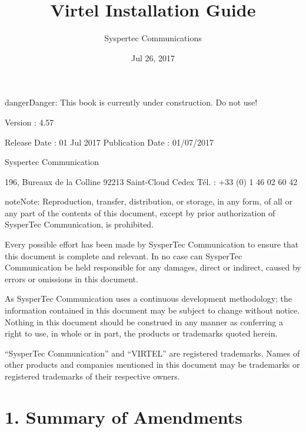 \documentclass[letterpaper,10pt,english]{sphinxmanual}
\title{Virtel Installation Guide}
\date{Jul 26, 2017}
\author{Syspertec Communications}
\begin{document}
\maketitle
\sphinxtableofcontents
{}\label{\detokenize{Installation_Guide::doc}}




\begin{sphinxadmonition}{danger}{Danger:}
This book is currently under construction. Do not use!
\end{sphinxadmonition}

Version : 4.57

Release Date : 01 Jul 2017 Publication Date : 01/07/2017

Syspertec Communication

196, Bureaux de la Colline 92213 Saint-Cloud Cedex Tél. : +33 (0) 1 46 02 60 42


\begin{sphinxadmonition}{note}{Note:}
Reproduction, transfer, distribution, or storage, in any form, of all or any part of
the contents of this document, except by prior authorization of SysperTec
Communication, is prohibited.

Every possible effort has been made by SysperTec Communication to ensure that this document
is complete and relevant. In no case can SysperTec Communication be held responsible for
any damages, direct or indirect, caused by errors or omissions in this document.

As SysperTec Communication uses a continuous development methodology; the information
contained in this document may be subject to change without notice. Nothing in this
document should be construed in any manner as conferring a right to use, in whole or in
part, the products or trademarks quoted herein.

“SysperTec Communication” and “VIRTEL” are registered trademarks. Names of other products
and companies mentioned in this document may be trademarks or registered trademarks of
their respective owners.
\end{sphinxadmonition}


\chapter{1. Summary of Amendments}
\label{\detokenize{Installation_Guide:summary-of-amendments}}\label{\detokenize{Installation_Guide:virtel457ig}}\label{\detokenize{Installation_Guide:installation-guide-v4-57}}
\end{document}
